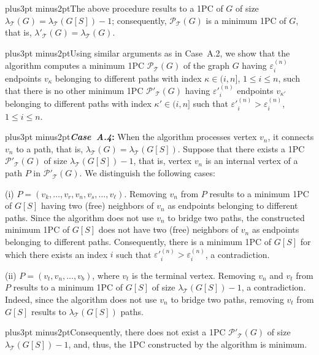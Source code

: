 \documentclass[10pt]{article}
\def\yskip{\penalty-50\vskip3pt plus3pt minus2pt}
\def\y{\yskip}
\begin{document}
{\y The above procedure results to a 1PC of $G$ of size
$\lambda_\mathcal{T}(G)=\lambda_\mathcal{T}(G[S])-1$;
consequently, $\mathcal{P_{\mathcal{T}}}(G)$ is a minimum 1PC of
$G$, that is, $\lambda'_\mathcal{T}(G)=\lambda_\mathcal{T}(G)$.

\y Using similar arguments as in Case~A.2, we show that the
algorithm computes a minimum 1PC $\mathcal{P_{\mathcal{T}}}(G)$ of
the graph $G$ having $\varepsilon^{(n)}_i$ endpoints $v_\kappa$
belonging to different paths with index $\kappa \in (i,n]$, $1
\leq i \leq n$, such that there is no other minimum 1PC
$\mathcal{P'_{\mathcal{T}}}(G)$ having $\varepsilon'^{(n)}_i$
endpoints $v_{\kappa'}$ belonging to different paths with index
$\kappa' \in (i,n]$ such that
$\varepsilon'^{(n)}_i>\varepsilon^{(n)}_i$, $1 \leq i \leq n$.

\y {\bf \textit{Case~A.4}:} When the algorithm processes vertex
$v_n$, it connects $v_n$ to a path, that is,
$\lambda_\mathcal{T}(G)=\lambda_\mathcal{T}(G[S])$. Suppose that
there exists a 1PC $\mathcal{P'_{\mathcal{T}}}(G)$ of size
$\lambda_\mathcal{T}(G[S])-1$, that is, vertex $v_n$ is an
internal vertex of a path $P$ in $\mathcal{P'_{\mathcal{T}}}(G)$.
We distinguish the following cases:

(i) $P=(v_k, \ldots, v_r, v_n, v_s, \ldots, v_\ell)$. Removing
$v_n$ from $P$ results to a minimum 1PC of $G[S]$ having two
(free) neighbors of $v_n$ as endpoints belonging to different
paths. Since the algorithm does not use $v_n$ to bridge two paths,
the constructed minimum 1PC of $G[S]$ does not have two (free)
neighbors of $v_n$ as endpoints belonging to different paths.
Consequently, there is a minimum 1PC of $G[S]$ for which there
exists an index $i$ such that
$\varepsilon'^{(n)}_i>\varepsilon^{(n)}_i$, a contradiction.

(ii) $P=(v_t, v_n, \ldots, v_b)$, where $v_t$ is the terminal
vertex.  Removing $v_n$ and $v_t$ from $P$ results to a minimum
1PC of $G[S]$ of size $\lambda_\mathcal{T}(G[S])-1$, a
contradiction. Indeed, since the algorithm does not use $v_n$ to
bridge two paths, removing $v_t$ from $G[S]$ results to
$\lambda_\mathcal{T}(G[S])$ paths.

\y Consequently, there does not exist a 1PC
$\mathcal{P'_{\mathcal{T}}}(G)$ of size
$\lambda_\mathcal{T}(G[S])-1$, and, thus, the 1PC constructed by
the algorithm is minimum.

}
\end{document}
